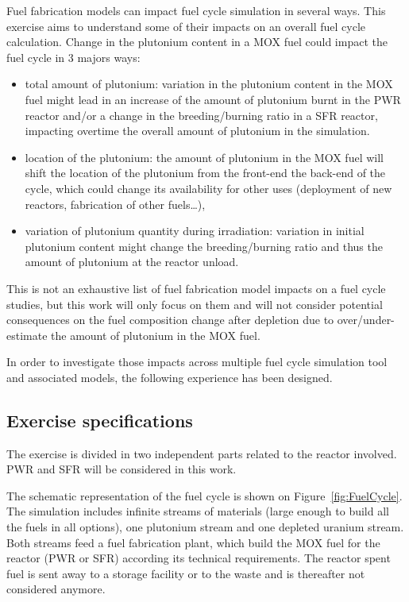Fuel fabrication models can impact fuel cycle simulation in several ways.
This exercise aims to understand some of their impacts on an overall fuel cycle calculation.
Change in the plutonium content in a \gls{MOX} fuel could impact the fuel cycle in 3 majors ways:

\begin{itemize}
    \item total amount of plutonium: variation in the plutonium content in the \gls{MOX} fuel might lead in an increase of the amount of plutonium burnt in the \gls{PWR} reactor and/or a change in the breeding/burning ratio in a \gls{SFR} reactor, impacting overtime the overall amount of plutonium in the simulation.
    \item location of the plutonium: the amount of plutonium in the \gls{MOX} fuel will shift the location of the plutonium from the front-end the back-end of the cycle, which could change its availability for other uses (deployment of new reactors, fabrication of other fuels\ldots),
    \item variation of plutonium quantity during irradiation: variation in initial plutonium content might change the breeding/burning ratio and thus the amount of plutonium at the reactor unload.
\end{itemize}
This is not an exhaustive list of fuel fabrication model impacts on a fuel cycle studies, but this work will only focus on them and will not consider potential consequences on the fuel composition change after depletion due to over/under-estimate the amount of plutonium in the \gls{MOX} fuel.

In order to investigate those impacts across multiple fuel cycle simulation tool and associated models, the following experience has been designed.

\subsection{Exercise specifications}

The exercise is divided in two independent parts related to the reactor involved.
\gls{PWR} and \gls{SFR} will be considered in this work.

The schematic representation of the fuel cycle is shown on Figure~\ref{fig:FuelCycle}.
The simulation includes infinite streams of materials (large enough to build all the fuels in all options), one plutonium stream and one depleted uranium stream.
Both streams feed a fuel fabrication plant, which build the MOX fuel for the reactor (\gls{PWR}  or \gls{SFR}) according its technical requirements.
The reactor spent fuel is sent away to a storage facility or to the waste and is thereafter not considered anymore.



